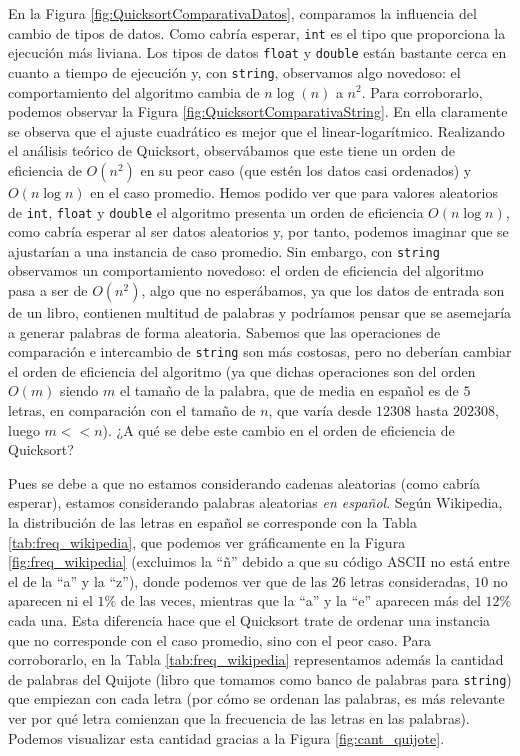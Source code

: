 \documentclass[12pt]{article}
\begin{document}
    En la Figura \ref{fig:QuicksortComparativaDatos}, comparamos la influencia del cambio de tipos de datos. Como cabría esperar, \verb|int| es el tipo que proporciona la ejecución más liviana. Los tipos de datos \verb|float| y \verb|double| están bastante cerca en cuanto a tiempo de ejecución y, con \verb|string|, observamos algo novedoso: el comportamiento del algoritmo cambia de $n\log(n)$ a $n^2$. Para corroborarlo, podemos observar la Figura \ref{fig:QuicksortComparativaString}. En ella claramente se observa que el ajuste cuadrático es mejor que el linear-logarítmico. Realizando el análisis teórico de Quicksort, observábamos que este tiene un orden de eficiencia de $O(n^2)$ en su peor caso (que estén los datos casi ordenados) y $O(n\log n)$ en el caso promedio. Hemos podido ver que para valores aleatorios de \verb|int|, \verb|float| y \verb|double| el algoritmo presenta un orden de eficiencia $O(n\log n)$, como cabría esperar al ser datos aleatorios y, por tanto, podemos imaginar que se ajustarían a una instancia de caso promedio. Sin embargo, con \verb|string| observamos un comportamiento novedoso: el orden de eficiencia del algoritmo pasa a ser de $O(n^2)$, algo que no esperábamos, ya que los datos de entrada son de un libro, contienen multitud de palabras y podríamos pensar que se asemejaría a generar palabras de forma aleatoria. Sabemos que las operaciones de comparación e intercambio de \verb|string| son más costosas, pero no deberían cambiar el orden de eficiencia del algoritmo (ya que dichas operaciones son del orden $O(m)$ siendo $m$ el tamaño de la palabra, que de media en español es de $5$ letras, en comparación con el tamaño de $n$, que varía desde $12308$ hasta $202308$, luego $m<<n$). ¿A qué se debe este cambio en el orden de eficiencia de Quicksort?

    Pues se debe a que no estamos considerando cadenas aleatorias (como cabría esperar), estamos considerando palabras aleatorias \emph{en español}. Según Wikipedia, la distribución de las letras en español se corresponde con la Tabla \ref{tab:freq_wikipedia}, que podemos ver gráficamente en la Figura \ref{fig:freq_wikipedia} (excluimos la ``ñ'' debido a que su código ASCII no está entre el de la ``a'' y la ``z''), donde podemos ver que de las $26$ letras consideradas, $10$ no aparecen ni el $1\%$ de las veces, mientras que la ``a'' y la ``e'' aparecen más del $12\%$ cada una. Esta diferencia hace que el Quicksort trate de ordenar una instancia que no corresponde con el caso promedio, sino con el peor caso. Para corroborarlo, en la Tabla \ref{tab:freq_wikipedia} representamos además la cantidad de palabras del Quijote (libro que tomamos como banco de palabras para \verb|string|) que empiezan con cada letra (por cómo se ordenan las palabras, es más relevante ver por qué letra comienzan que la frecuencia de las letras en las palabras). Podemos visualizar esta cantidad gracias a la Figura \ref{fig:cant_quijote}.
    
\end{document}
